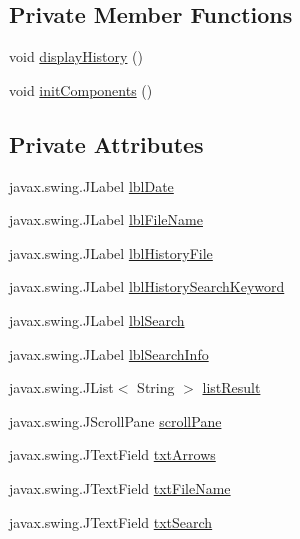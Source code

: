 \subsection*{Private Member Functions}
\begin{DoxyCompactItemize}
\item 
void \hyperlink{classkeylistener_1_1_key_g_u_i_aee81c72d2c77342da78a38116883cf6f}{display\+History} ()
\item 
void \hyperlink{classkeylistener_1_1_key_g_u_i_a43be7b88fdba1420ee3f0d1c2c4c2748}{init\+Components} ()
\end{DoxyCompactItemize}
\subsection*{Private Attributes}
\begin{DoxyCompactItemize}
\item 
javax.\+swing.\+J\+Label \hyperlink{classkeylistener_1_1_key_g_u_i_ad2118979cc01e139f390529e68561b36}{lbl\+Date}
\item 
javax.\+swing.\+J\+Label \hyperlink{classkeylistener_1_1_key_g_u_i_a2d31eb97ae580ba4b09f1dd84a95bdb1}{lbl\+File\+Name}
\item 
javax.\+swing.\+J\+Label \hyperlink{classkeylistener_1_1_key_g_u_i_a330b92f9f544948e4e0b55307637ce6b}{lbl\+History\+File}
\item 
javax.\+swing.\+J\+Label \hyperlink{classkeylistener_1_1_key_g_u_i_aa0cbe65091b2645ad5f3e70be1d33702}{lbl\+History\+Search\+Keyword}
\item 
javax.\+swing.\+J\+Label \hyperlink{classkeylistener_1_1_key_g_u_i_a651562b55ac5b267be118fa85ee83b5d}{lbl\+Search}
\item 
javax.\+swing.\+J\+Label \hyperlink{classkeylistener_1_1_key_g_u_i_aa1b6d17eb8dab8ab033595be8cc66b81}{lbl\+Search\+Info}
\item 
javax.\+swing.\+J\+List$<$ String $>$ \hyperlink{classkeylistener_1_1_key_g_u_i_a53c4619456ef147805fdbd0f33527fa7}{list\+Result}
\item 
javax.\+swing.\+J\+Scroll\+Pane \hyperlink{classkeylistener_1_1_key_g_u_i_a036bb4e1e1c9b3761717272205313fe1}{scroll\+Pane}
\item 
javax.\+swing.\+J\+Text\+Field \hyperlink{classkeylistener_1_1_key_g_u_i_aa44762235ff4e3550950dded18266104}{txt\+Arrows}
\item 
javax.\+swing.\+J\+Text\+Field \hyperlink{classkeylistener_1_1_key_g_u_i_a49dc969b4b81645b57ce0ac461617031}{txt\+File\+Name}
\item 
javax.\+swing.\+J\+Text\+Field \hyperlink{classkeylistener_1_1_key_g_u_i_a12219fa977d21d4d00c2bdd827103a41}{txt\+Search}
\end{DoxyCompactItemize}


